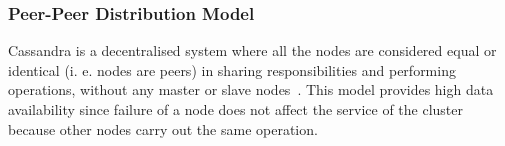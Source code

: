 \subsubsection{Peer-Peer Distribution Model}
Cassandra is a decentralised system  where all the nodes are considered equal
or identical (i. e.  nodes are peers) in sharing responsibilities and performing
operations,  without any  master or slave nodes~\citep{datastaxB,BOOK}. 
This model provides high data availability since failure
of a node does not affect the service of the cluster  because other
nodes carry out the same operation. 


